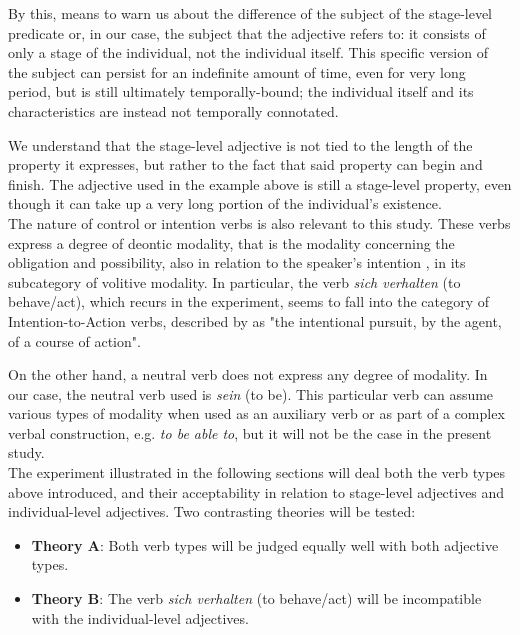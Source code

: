 \documentclass[12pt,a4paper]{article}
\begin{document}
By this, \citeauthor{Carlson1977} means to warn us about the difference of the subject of the stage-level predicate or, in our case, the subject that the adjective refers to: it consists of only a stage of the individual, not the individual itself. This specific version of the subject can persist for an indefinite amount of time, even for very long period, but is still ultimately temporally-bound; the individual itself and its characteristics are instead not temporally connotated.

We understand that the stage-level adjective is not tied to the length of the property it expresses, but rather to the fact that said property can begin and finish. The adjective used in the example above is still a stage-level property, even though it can take up a very long portion of the individual's existence.\\

The nature of control or intention verbs is also relevant to this study. These verbs express a degree of deontic modality, that is the modality concerning the obligation and possibility, also in relation to the speaker's intention \parencite{simpson1993}, in its subcategory of volitive modality. In particular, the verb \textit{\gls{sich verhalten}} (to behave/act), which recurs in the experiment, seems to fall into the category of Intention-to-Action verbs, described by \parencite{Khudairi2015} %
 as "the intentional pursuit, by the agent, of a course of action". 

On the other hand, a neutral verb does not express any degree of modality. In our case, the neutral verb used is \textit{\gls{sein}} (to be). This particular verb can assume various types of modality when used as an auxiliary verb or as part of a complex verbal construction, e.g. \textit{to be able to}, but it will not be the case in the present study.\\

The experiment illustrated in the following sections will deal both the verb types above introduced, and their acceptability in relation to stage-level adjectives and individual-level adjectives. Two contrasting theories will be tested:

\begin{itemize}
\item \textbf{Theory A}: Both verb types will be judged equally well with both adjective types.
\item \textbf{Theory B}: The verb \textit{\gls{sich verhalten}} (to behave/act) will be incompatible with the individual-level adjectives.
\end{itemize}
\end{document}
